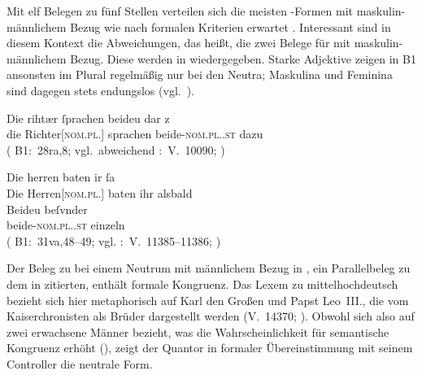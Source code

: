Mit elf Belegen zu fünf Stellen verteilen sich die meisten
-Formen mit maskulin-männlichem Bezug wie nach formalen Kriterien
erwartet \autocites(siehe auch )[vgl.][182]{ksw2}.
Interessant sind in diesem Kontext die Abweichungen, das heißt,
die zwei Belege für  mit maskulin-männlichem Bezug. Diese werden
in  wiedergegeben. Starke Adjektive
zeigen in B1 ansonsten  im Plural regel\-mäßig nur bei den Neutra;
Maskulina und Feminina sind dagegen stets endungslos
(vgl.~).

\begin{exe}
\ex \label{ex:richtherriu}
	\begin{xlist}
	\ex \gll Die rihtær ſprachen beideu {dar z} \\
			die Richter[\textsc{nom.pl.\MascM}] sprachen beide-\textsc{nom.pl.\NeutM.st}
			dazu \\
		\trans {}
			(%
				B1:~28ra,8; vgl.~abweichend
				\KC:~V.~10090;
				\cite[267]{schroeder1895}%
			)
		\label{ex:richtherriu_1}

	\ex \gll Die herren baten ir ſa \\
			Die Herren[\textsc{nom.pl.\MascM}] baten ihr alsbald \\
	\sn \gll Beideu beſvnder \\
			beide-\textsc{nom.pl.\NeutM.st} einzeln \\
		\trans {}
			(%
				B1:~31va,48--49; vgl.
				\KC:~V.~11385--11386;
				\cite[289]{schroeder1895}%
			)
		\label{ex:richtherriu_2}
	\end{xlist}
\end{exe}

\label{phsec:baideuwarn}
Der Beleg zu  bei einem Neutrum mit männlichem Bezug in
, ein Parallelbeleg zu dem in
 zitierten, enthält formale
Kongruenz. Das Lexem
  zu mittelhochdeutsch  
\autocites[s.\,v.~]{mwb1}[vgl.~auch][53]{kroonen2013} bezieht sich
hier metaphorisch auf Karl den Großen und Papst Leo~III., die vom
Kaiserchronisten als Brüder dargestellt werden (V.~14370;
\cites[341]{schroeder1895}[vgl.][83]{weis2022}). Obwohl sich  also
auf zwei erwachsene Männer bezieht, was die Wahrscheinlichkeit für semantische
Kongruenz erhöht (), zeigt der Quantor in formaler
Übereinstimmung mit seinem Controller die neutrale Form.

